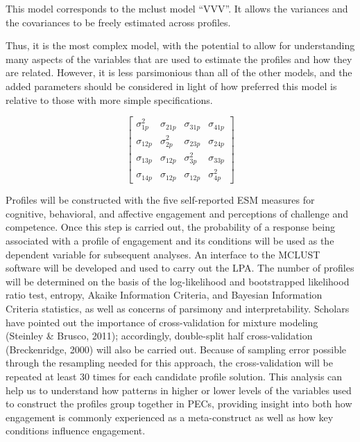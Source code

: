 \documentclass[]{book}
\theoremstyle{definition}
\theoremstyle{definition}
\theoremstyle{definition}
\theoremstyle{remark}
\begin{document}
This model corresponds to the mclust model ``VVV''. It allows the
variances and the covariances to be freely estimated across profiles.

Thus, it is the most complex model, with the potential to allow for
understanding many aspects of the variables that are used to estimate
the profiles and how they are related. However, it is less parsimonious
than all of the other models, and the added parameters should be
considered in light of how preferred this model is relative to those
with more simple specifications.

\[
\left[ \begin{matrix} { \sigma  }_{ 1p }^{ 2 } & { \sigma  }_{ 21p } & { \sigma  }_{ 31p } & { \sigma  }_{ 41p } \\ { \sigma  }_{ 12p } & { \sigma  }_{ 2p }^{ 2 } & { \sigma  }_{ 23p } & { \sigma  }_{ 24p } \\ { \sigma  }_{ 13p } & { \sigma  }_{ 12p } & { \sigma  }_{ 3p }^{ 2 } & { \sigma  }_{ 33p } \\ { \sigma  }_{ 14p } & { \sigma  }_{ 12p } & { \sigma  }_{ 12p } & { \sigma  }_{ 4p }^{ 2 } \end{matrix} \right] 
\]

Profiles will be constructed with the five self-reported ESM measures
for cognitive, behavioral, and affective engagement and perceptions of
challenge and competence. Once this step is carried out, the probability
of a response being associated with a profile of engagement and its
conditions will be used as the dependent variable for subsequent
analyses. An interface to the MCLUST software will be developed and used
to carry out the LPA. The number of profiles will be determined on the
basis of the log-likelihood and bootstrapped likelihood ratio test,
entropy, Akaike Information Criteria, and Bayesian Information Criteria
statistics, as well as concerns of parsimony and interpretability.
Scholars have pointed out the importance of cross-validation for mixture
modeling (Steinley \& Brusco, 2011); accordingly, double-split half
cross-validation (Breckenridge, 2000) will also be carried out. Because
of sampling error possible through the resampling needed for this
approach, the cross-validation will be repeated at least 30 times for
each candidate profile solution. This analysis can help us to understand
how patterns in higher or lower levels of the variables used to
construct the profiles group together in PECs, providing insight into
both how engagement is commonly experienced as a meta-construct as well
as how key conditions influence engagement.
\end{document}
